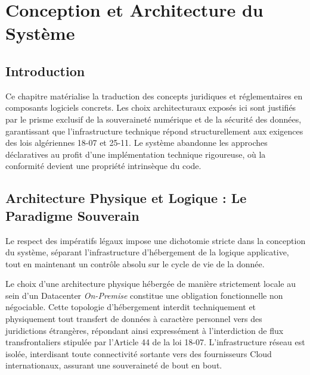 \chapter{Conception et Architecture du Système}
\label{ch:conception_architecture}

\section{Introduction}
Ce chapitre matérialise la traduction des concepts juridiques et réglementaires en composants logiciels concrets. Les choix architecturaux exposés ici sont justifiés par le prisme exclusif de la souveraineté numérique et de la sécurité des données, garantissant que l'infrastructure technique répond structurellement aux exigences des lois algériennes 18-07 et 25-11. Le système abandonne les approches déclaratives au profit d'une implémentation technique rigoureuse, où la conformité devient une propriété intrinsèque du code.

\section{Architecture Physique et Logique : Le Paradigme Souverain}
Le respect des impératifs légaux impose une dichotomie stricte dans la conception du système, séparant l'infrastructure d'hébergement de la logique applicative, tout en maintenant un contrôle absolu sur le cycle de vie de la donnée.

Le choix d'une architecture physique hébergée de manière strictement locale au sein d'un Datacenter \textit{On-Premise} constitue une obligation fonctionnelle non négociable. Cette topologie d'hébergement interdit techniquement et physiquement tout transfert de données à caractère personnel vers des juridictions étrangères, répondant ainsi expressément à l'interdiction de flux transfrontaliers stipulée par l'Article 44 de la loi 18-07. L'infrastructure réseau est isolée, interdisant toute connectivité sortante vers des fournisseurs Cloud internationaux, assurant une souveraineté de bout en bout.

